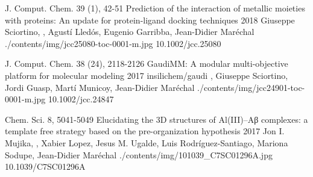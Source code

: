 \begin{cventries}
  \pubentry
    {J. Comput. Chem. 39 (1), 42-51} %
    {Prediction of the interaction of metallic moieties with proteins: An update for protein-ligand docking techniques} %
    {2018} %
    {} %
    {Giuseppe Sciortino, , Agustí Lledós, Eugenio Garribba, Jean-Didier Maréchal} %
    {./contents/img/jcc25080-toc-0001-m.jpg} %
    {10.1002/jcc.25080} %

  \pubentry
    {J. Comput. Chem. 38 (24), 2118-2126} %
    {GaudiMM: A modular multi-objective platform for molecular modeling} %
    {2017} %
    {insilichem/gaudi} %
    {,\textsuperscript{\dagger} Giuseppe Sciortino, Jordi Guasp, Martí Municoy, Jean-Didier Maréchal\textsuperscript{\dagger}} %
    {./contents/img/jcc24901-toc-0001-m.jpg} %
    {10.1002/jcc.24847} %

    \pubentry
    {Chem. Sci. 8, 5041-5049} %
    {Elucidating the 3D structures of Al(III)–Aβ complexes: a template free strategy based on the pre-organization hypothesis} %
    {2017} %
    {} %
    {Jon I. Mujika, , Xabier Lopez, Jesus M. Ugalde, Luis Rodríguez-Santiago, Mariona Sodupe, Jean-Didier Maréchal} %
    {./contents/img/101039_C7SC01296A.jpg} %
    {10.1039/C7SC01296A} %

\end{cventries}

